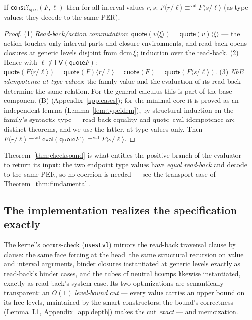 \documentclass{lmcs}
\newcommand{\hcomp}{\mathsf{hcomp}}
\newcommand{\FV}{\mathsf{FV}}
\newcommand{\valeq}{\equiv^{\mathrm{val}}}
\newcommand{\evalop}{\mathsf{eval}}
\newcommand{\constspec}{\mathsf{const?}_{\mathrm{spec}}}
\newcommand{\quo}{\mathsf{quote}}
\begin{document}
\begin{thm}\label{thm:checksound}
  If $\constspec(F, \ell)$ then for all interval values $r, s$:
  $F\langle r/\ell\rangle \valeq F\langle s/\ell\rangle$ (as type
  values: they decode to the same PER).
\end{thm}
\begin{proof}
  (1) \emph{Read-back/action commutation}:
  $\quo(v\langle\xi\rangle) = \quo(v)\langle\xi\rangle$ --- the
  action touches only interval parts and closure environments, and
  read-back opens closures at generic levels disjoint from
  $\mathrm{dom}\,\xi$; induction over the read-back.
  (2) Hence with $\ell \notin \FV(\quo F)$:
  $\quo(F\langle r/\ell\rangle) = \quo(F)\langle r/\ell\rangle =
  \quo(F) = \quo(F\langle s/\ell\rangle)$.
  (3) \emph{NbE idempotence at type values}: the family value and
  the evaluation of its read-back determine the same relation.  For
  the general calculus this is part of the base component (B)
  (Appendix~\ref{app:cases}); for the minimal core it is proved as
  an independent lemma (Lemma~\ref{lem:typeidem}), by structural
  induction on the family's syntactic type --- read-back equality
  and quote--eval idempotence are distinct theorems, and we use the
  latter, at type values only.  Then
  $F\langle r/\ell\rangle \valeq \evalop(\quo F) \valeq
  F\langle s/\ell\rangle$.
\end{proof}

\noindent Theorem~\ref{thm:checksound} is what entitles the positive
branch of the evaluator to return its input: the two endpoint type
values have \emph{equal read-back} and decode to the same PER, so no
coercion is needed --- see the transport case of
Theorem~\ref{thm:fundamental}.

\subsection{The implementation realizes the specification exactly}
\label{sec:implcheck}

The kernel's occurs-check (\texttt{usesLvl}) mirrors the read-back
traversal clause by clause: the same face forcing at the head, the
same structural recursion on value and interval arguments, binder
closures instantiated at generic levels exactly as read-back's
binder cases, and the tubes of neutral $\hcomp$s likewise
instantiated, exactly as read-back's system case.  Its two
optimizations are semantically transparent: an $O(1)$
\emph{level-bound cut} --- every value carries an upper bound on its
free levels, maintained by the smart constructors; the bound's
correctness (Lemma~L1, Appendix~\ref{app:depth}) makes the cut
\emph{exact} --- and memoization.
\end{document}
